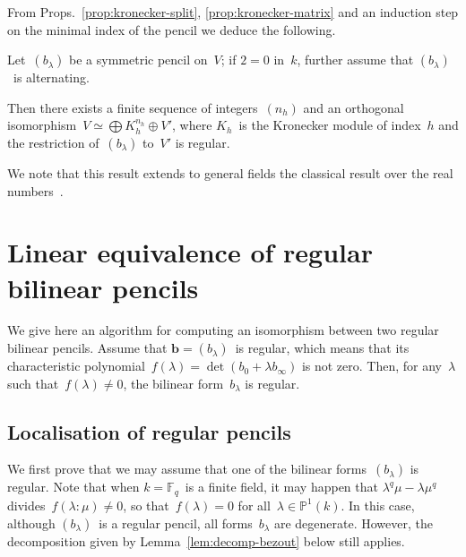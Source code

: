 \documentclass{article}%
\def\F{\mathbb{F}}
\begin{document}
From Props.~\ref{prop:kronecker-split}, \ref{prop:kronecker-matrix} and
an induction step on the minimal index of the pencil we deduce the
following.

\begin{prop}\label{prop:kronecker}%
Let~$(b_{λ})$ be a symmetric pencil on~$V$; if $2 = 0$ in~$k$, further
assume that $(b_{λ})$~is alternating.

Then there exists a finite sequence of integers~$(n_h)$ and 
an orthogonal isomorphism~$V ≃ ⨁ K_h^{n_h} ⊕ V'$,
where $K_h$~is the Kronecker module of index~$h$
and the restriction of~$(b_{λ})$ to~$V'$ is regular.
\end{prop}

We note that this result extends to general fields
the classical result over the real numbers~\cite[XII, §4]{Gantmacher}.
\section{Linear equivalence of regular bilinear pencils}%
\label{S:bil-regular}

We give here an algorithm for computing an isomorphism between two
regular bilinear pencils. Assume that $\bm{b} = (b_{λ})$~is regular,
which means that its characteristic polynomial~$f(λ) = \det (b_0 + λ
b_{∞})$ is not zero. Then, for any~$λ$ such that~$f(λ) ≠ 0$, the bilinear
form~$b_{λ}$ is regular.

\subsection{Localisation of regular pencils}%
\label{SS:bil-reg-local}

We first prove that we may assume that one of the bilinear
forms~$(b_{λ})$ is regular.
Note that when $k = \F_q$~is a finite field, it may happen that $λ^q μ -
λ μ^q$ divides~$f(λ:μ) ≠ 0$, so that~$f(λ) = 0$ for all~$λ ∈ ℙ^1(k)$. In
this case, although $(b_{λ})$~is a regular pencil, all forms~$b_{λ}$ are
degenerate. However, the decomposition given by
Lemma~\ref{lem:decomp-bezout} below still applies.
\end{document}

